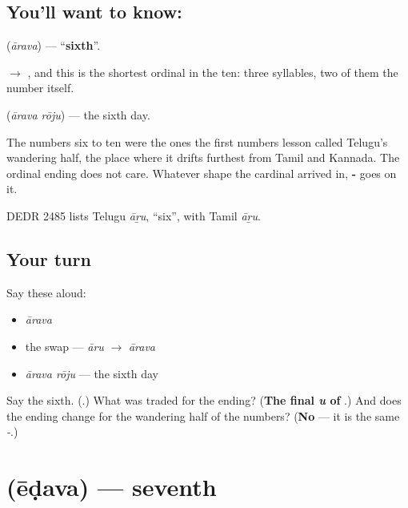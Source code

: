 \subsection*{You'll want to know: }
\textbf{} (\emph{ārava}) — \textquotedblleft{}\textbf{sixth}\textquotedblright{}.

\textbf{} $\to$ \textbf{}, and this is the shortest ordinal in the ten: three syllables, two of them the number itself.

\textbf{ } (\emph{ārava rōju}) — the sixth day.

The numbers six to ten were the ones the first numbers lesson called Telugu's wandering half, the place where it drifts furthest from Tamil and Kannada. The ordinal ending does not care. Whatever shape the cardinal arrived in, \textbf{-} goes on it.

DEDR 2485 lists Telugu \emph{āṟu}, \textquotedblleft{}six\textquotedblright{}, with Tamil \emph{āṟu}.

\subsection*{Your turn}
Say these aloud:

\begin{itemize}
\raggedright
  \item \emph{ārava}
  \item the swap — \emph{āru} $\to$ \emph{ārava}
  \item \emph{ārava rōju} — the sixth day
\end{itemize}

\begin{tcolorbox}[breakable,colback=teal!4,colframe=teal!35!black,title={Before you move on}]
Say the sixth. (\textbf{}.) What was traded for the ending? (\textbf{The final \emph{u} of }.) And does the ending change for the wandering half of the numbers? (\textbf{No} — it is the same \emph{-}.)
\end{tcolorbox}
\section[\texorpdfstring{\te{ఏడవ} (ēḍava)}{ఏడవ (ēḍava)}]{ (ēḍava) — seventh}

\label{lesson:TE-C82-seventh}




